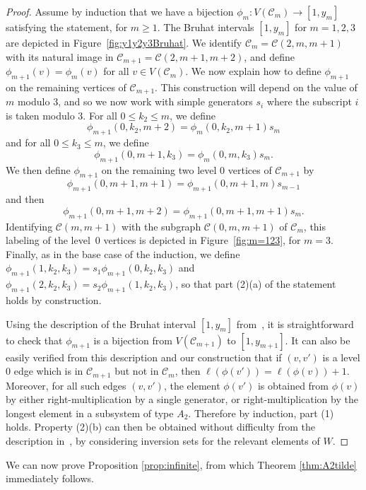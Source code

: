 \documentclass[11pt]{amsart}
\theoremstyle{plain}
\theoremstyle{definition}
\newcommand{\cC}{\mathcal{C}}
\numberwithin{equation}{subsection}
\begin{document}
\begin{proof}
Assume by induction that we have a bijection $\phi_m:V(\cC_m) \to [1,y_m]$ satisfying the statement, for $m \geq 1$. The Bruhat intervals $[1,y_m]$ for $m = 1,2,3$ are depicted in Figure~\ref{fig:y1y2y3Bruhat}. We identify $\cC_m = \cC(2,m,m+1)$ with its natural image in $\cC_{m+1} = \cC(2,m+1,m+2)$, and define $\phi_{m+1}(v) = \phi_m(v)$ for all $v \in V(\cC_m)$. We now explain how to define $\phi_{m+1}$ on the remaining vertices of $\cC_{m+1}$. This construction will depend on the value of $m$ modulo $3$, and so we now work with simple generators $s_i$ where the subscript $i$ is taken modulo $3$. For all $0 \leq k_2 \leq m$, we define
\[
\phi_{m+1}(0,k_2,m+2) = \phi_m(0,k_2,m+1) s_m
\]
and for all $0 \leq k_3 \leq m$, we define
\[
\phi_{m+1}(0,m+1,k_3) = \phi_m(0,m,k_3) s_m.
\]
We then define $\phi_{m+1}$ on the remaining two level $0$ vertices of $\cC_{m+1}$ by
\[
\phi_{m+1}(0,m+1,m+1) = \phi_{m+1}(0,m+1,m) s_{m-1}\] and then \[ \phi_{m+1}(0,m+1,m+2) = \phi_{m+1}(0,m+1,m+1) s_m.
\]
Identifying $\cC(m,m+1)$ with the subgraph $\cC(0,m,m+1)$ of $\cC_m$, this labeling of the level~$0$ vertices is depicted in Figure~\ref{fig:m=123}, for $m = 3$.
Finally, as in the base case of the induction, we define $\phi_{m+1}(1,k_2,k_3) = s_1 \phi_{m+1}(0,k_2,k_3)$ and $\phi_{m+1}(2,k_2,k_3) = s_2 \phi_{m+1}(1,k_2,k_3)$, so that part (2)(a) of the statement holds by construction.

Using the description of the Bruhat interval $[1,y_m]$ from~\cite{LibedinskyPatimo}, it is straightforward to check that $\phi_{m+1}$ is a bijection from $V(\cC_{m+1})$ to $[1,y_{m+1}]$. It can also be easily verified from this description and our construction that if $(v,v')$ is a level $0$ edge which is in $\cC_{m+1}$ but not in $\cC_m$, then $\ell(\phi(v')) = \ell(\phi(v)) + 1$. Moreover, for all such edges $(v,v')$, the element $\phi(v')$ is obtained from $\phi(v)$ by either right-multiplication by a single generator, or right-multiplication by the longest element in a subsystem of type $A_2$. Therefore by induction, part (1) holds. Property (2)(b) can then be obtained without difficulty from the description in~\cite{LibedinskyPatimo}, by considering inversion sets for the relevant elements of $W$.
\end{proof}

We can now prove Proposition \ref{prop:infinite}, from which Theorem \ref{thm:A2tilde} immediately follows.
\end{document}
